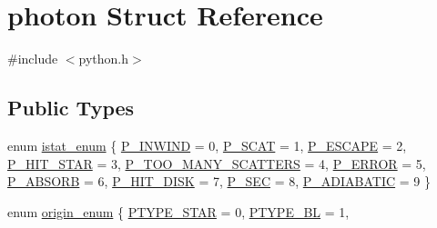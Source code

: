 \hypertarget{structphoton}{}\section{photon Struct Reference}
\label{structphoton}


{\ttfamily \#include $<$python.\+h$>$}

\subsection*{Public Types}
\begin{DoxyCompactItemize}
\item 
enum \hyperlink{structphoton_ae56bb7ca587dc91f44d8c72a6a571f45}{istat\+\_\+enum} \{ \newline
\hyperlink{structphoton_ae56bb7ca587dc91f44d8c72a6a571f45ad4bbb33a18f68d8fa99598e3a44291f3}{P\+\_\+\+I\+N\+W\+I\+ND} = 0, 
\hyperlink{structphoton_ae56bb7ca587dc91f44d8c72a6a571f45a7049b3f8546fe852a17c790e4be43d56}{P\+\_\+\+S\+C\+AT} = 1, 
\hyperlink{structphoton_ae56bb7ca587dc91f44d8c72a6a571f45aa37b54e0d964345f5fd2d98c848392a8}{P\+\_\+\+E\+S\+C\+A\+PE} = 2, 
\hyperlink{structphoton_ae56bb7ca587dc91f44d8c72a6a571f45a90e4bec9cba520e77e42500720711ced}{P\+\_\+\+H\+I\+T\+\_\+\+S\+T\+AR} = 3, 
\newline
\hyperlink{structphoton_ae56bb7ca587dc91f44d8c72a6a571f45ae7e9ea08f4cac79726f53b851183bcec}{P\+\_\+\+T\+O\+O\+\_\+\+M\+A\+N\+Y\+\_\+\+S\+C\+A\+T\+T\+E\+RS} = 4, 
\hyperlink{structphoton_ae56bb7ca587dc91f44d8c72a6a571f45a69b2139cb91cad8e6cf691c625107f12}{P\+\_\+\+E\+R\+R\+OR} = 5, 
\hyperlink{structphoton_ae56bb7ca587dc91f44d8c72a6a571f45a5d14e67c864da8c98dbd5f8762ca4661}{P\+\_\+\+A\+B\+S\+O\+RB} = 6, 
\hyperlink{structphoton_ae56bb7ca587dc91f44d8c72a6a571f45a78ed840f7a8abfe5d0386e8791661b34}{P\+\_\+\+H\+I\+T\+\_\+\+D\+I\+SK} = 7, 
\newline
\hyperlink{structphoton_ae56bb7ca587dc91f44d8c72a6a571f45af734acb396a428a91be434cc3b53d1ea}{P\+\_\+\+S\+EC} = 8, 
\hyperlink{structphoton_ae56bb7ca587dc91f44d8c72a6a571f45a05b54609857135f4ec62f8c4d91fa8aa}{P\+\_\+\+A\+D\+I\+A\+B\+A\+T\+IC} = 9
 \}
\item 
enum \hyperlink{structphoton_a6e3512103ffd5c0d6004cd432cdc4c3a}{origin\+\_\+enum} \{ \newline
\hyperlink{structphoton_a6e3512103ffd5c0d6004cd432cdc4c3aaec49d91fbf56d1c37fc817e32eb5a684}{P\+T\+Y\+P\+E\+\_\+\+S\+T\+AR} = 0, 
\hyperlink{structphoton_a6e3512103ffd5c0d6004cd432cdc4c3aa400842dd57553879d686ef17157f9c27}{P\+T\+Y\+P\+E\+\_\+\+BL} = 1, 

\end{DoxyCompactItemize}
